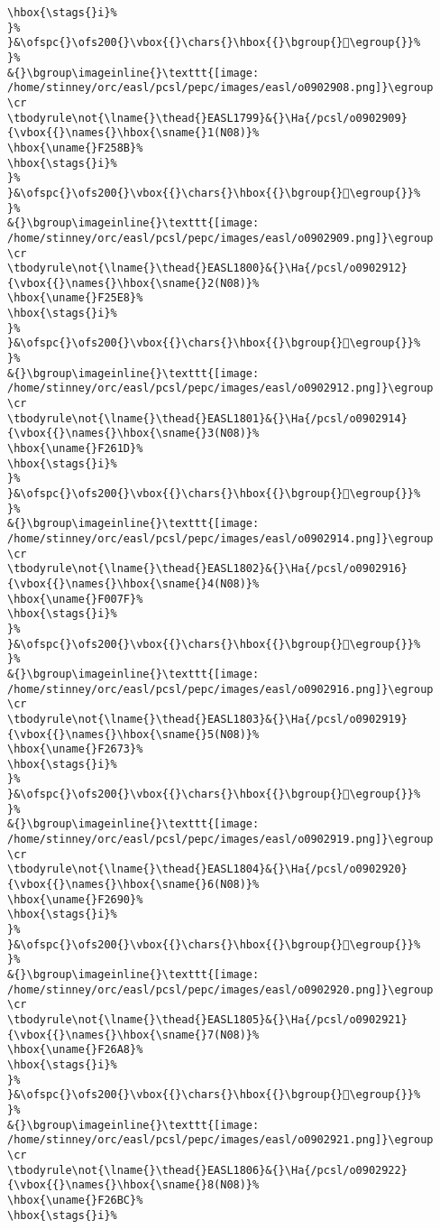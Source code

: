 \begin{verbatim}
\hbox{\stags{}i}%
}%
}&\ofspc{}\ofs200{}\vbox{{}\chars{}\hbox{{}\bgroup{}󲘜\egroup{}}%
}%
&{}\bgroup\imageinline{}\texttt{[image: /home/stinney/orc/easl/pcsl/pepc/images/easl/o0902908.png]}\egroup
\cr
\tbodyrule\not{\lname{}\thead{}EASL1799}&{}\Ha{/pcsl/o0902909}{\vbox{{}\names{}\hbox{\sname{}1(N08)}%
\hbox{\uname{}F258B}%
\hbox{\stags{}i}%
}%
}&\ofspc{}\ofs200{}\vbox{{}\chars{}\hbox{{}\bgroup{}󲖋\egroup{}}%
}%
&{}\bgroup\imageinline{}\texttt{[image: /home/stinney/orc/easl/pcsl/pepc/images/easl/o0902909.png]}\egroup
\cr
\tbodyrule\not{\lname{}\thead{}EASL1800}&{}\Ha{/pcsl/o0902912}{\vbox{{}\names{}\hbox{\sname{}2(N08)}%
\hbox{\uname{}F25E8}%
\hbox{\stags{}i}%
}%
}&\ofspc{}\ofs200{}\vbox{{}\chars{}\hbox{{}\bgroup{}󲗨\egroup{}}%
}%
&{}\bgroup\imageinline{}\texttt{[image: /home/stinney/orc/easl/pcsl/pepc/images/easl/o0902912.png]}\egroup
\cr
\tbodyrule\not{\lname{}\thead{}EASL1801}&{}\Ha{/pcsl/o0902914}{\vbox{{}\names{}\hbox{\sname{}3(N08)}%
\hbox{\uname{}F261D}%
\hbox{\stags{}i}%
}%
}&\ofspc{}\ofs200{}\vbox{{}\chars{}\hbox{{}\bgroup{}󲘝\egroup{}}%
}%
&{}\bgroup\imageinline{}\texttt{[image: /home/stinney/orc/easl/pcsl/pepc/images/easl/o0902914.png]}\egroup
\cr
\tbodyrule\not{\lname{}\thead{}EASL1802}&{}\Ha{/pcsl/o0902916}{\vbox{{}\names{}\hbox{\sname{}4(N08)}%
\hbox{\uname{}F007F}%
\hbox{\stags{}i}%
}%
}&\ofspc{}\ofs200{}\vbox{{}\chars{}\hbox{{}\bgroup{}󰁿\egroup{}}%
}%
&{}\bgroup\imageinline{}\texttt{[image: /home/stinney/orc/easl/pcsl/pepc/images/easl/o0902916.png]}\egroup
\cr
\tbodyrule\not{\lname{}\thead{}EASL1803}&{}\Ha{/pcsl/o0902919}{\vbox{{}\names{}\hbox{\sname{}5(N08)}%
\hbox{\uname{}F2673}%
\hbox{\stags{}i}%
}%
}&\ofspc{}\ofs200{}\vbox{{}\chars{}\hbox{{}\bgroup{}󲙳\egroup{}}%
}%
&{}\bgroup\imageinline{}\texttt{[image: /home/stinney/orc/easl/pcsl/pepc/images/easl/o0902919.png]}\egroup
\cr
\tbodyrule\not{\lname{}\thead{}EASL1804}&{}\Ha{/pcsl/o0902920}{\vbox{{}\names{}\hbox{\sname{}6(N08)}%
\hbox{\uname{}F2690}%
\hbox{\stags{}i}%
}%
}&\ofspc{}\ofs200{}\vbox{{}\chars{}\hbox{{}\bgroup{}󲚐\egroup{}}%
}%
&{}\bgroup\imageinline{}\texttt{[image: /home/stinney/orc/easl/pcsl/pepc/images/easl/o0902920.png]}\egroup
\cr
\tbodyrule\not{\lname{}\thead{}EASL1805}&{}\Ha{/pcsl/o0902921}{\vbox{{}\names{}\hbox{\sname{}7(N08)}%
\hbox{\uname{}F26A8}%
\hbox{\stags{}i}%
}%
}&\ofspc{}\ofs200{}\vbox{{}\chars{}\hbox{{}\bgroup{}󲚨\egroup{}}%
}%
&{}\bgroup\imageinline{}\texttt{[image: /home/stinney/orc/easl/pcsl/pepc/images/easl/o0902921.png]}\egroup
\cr
\tbodyrule\not{\lname{}\thead{}EASL1806}&{}\Ha{/pcsl/o0902922}{\vbox{{}\names{}\hbox{\sname{}8(N08)}%
\hbox{\uname{}F26BC}%
\hbox{\stags{}i}%

\end{verbatim}
